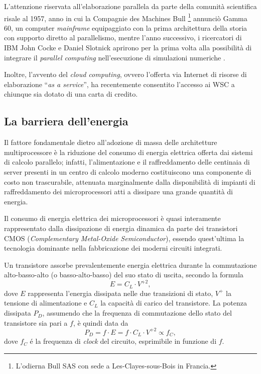 L'attenzione riservata all'elaborazione parallela da parte della comunit\`a scientifica risale al 1957, anno in cui la Compagnie des Machines Bull
\footnote{L'odierna Bull SAS con sede a Les-Clayes-sous-Bois in Francia.} annunci\`o Gamma 60, un computer \textit{mainframe}
equipaggiato con la prima architettura della storia con supporto diretto
al parallelismo, mentre l'anno successivo, i ricercatori di IBM John
Cocke e Daniel Slotnick aprirono per la prima volta alla
possibilit\`a di integrare il \textit{parallel computing} nell'esecuzione di simulazioni numeriche \cite{Wilson1994}.

Inoltre, l'avvento del \textit{cloud computing}, ovvero l'offerta via Internet di risorse di elaborazione \enquote{\textit{as a service}}, ha recentemente consentito l'accesso ai WSC a chiunque sia dotato di una carta di credito.
\subsection{La barriera dell'energia}
\nocite{Spirito2021}
Il fattore fondamentale dietro all'adozione di massa delle architetture multiprocessore \`e la riduzione del consumo di energia elettrica offerta dai sistemi di calcolo parallelo; infatti, l'alimentazione e il raffreddamento delle centinaia di server presenti in un centro di calcolo moderno costituiscono una componente di costo non trascurabile, attenuata marginalmente dalla disponibilit\`a di impianti di raffreddamento dei microprocessori atti a dissipare una grande quantit\`a di energia.

Il consumo di energia elettrica dei microprocessori \`e quasi interamente rappresentato dalla dissipazione di energia dinamica da parte dei transistori CMOS (\textit{Complementary Metal-Oxide Semiconductor}), essendo quest'ultima la tecnologia dominante nella fabbricazione dei moderni circuiti integrati.

Un transistore assorbe prevalentemente energia elettrica durante la commutazione alto-basso-alto (o basso-alto-basso) del suo stato di uscita, secondo la formula
\begin{equation}
    E = C_{L} \cdot V^{+2},
\end{equation}
dove $E$ rappresenta l'energia dissipata nelle due transizioni di stato, $V^{+}$ la tensione di alimentazione e $C_{L}$ la capacit\`a di carico del transistore.\newline
La potenza dissipata $P_{D}$, assumendo che la frequenza di commutazione dello stato del transistore sia pari a $f$, \`e quindi data da
\begin{equation}
    P_{D} = f \cdot E = f \cdot C_{L} \cdot V^{+2} \propto f_{C},
\end{equation}
dove $f_{C}$ \'e la frequenza di \textit{clock} del circuito, esprimibile in funzione di $f$.

